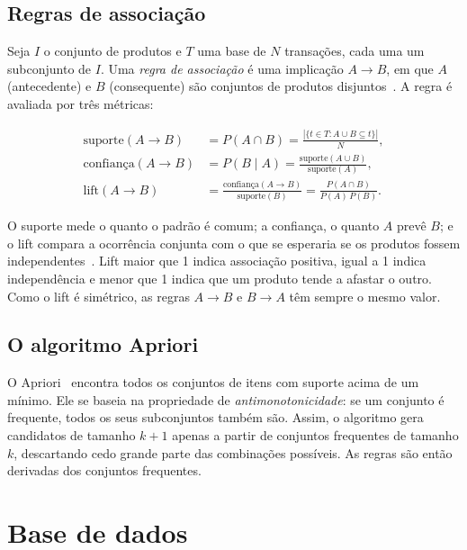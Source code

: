 \documentclass[11pt,a4paper]{article}
\begin{document}
\subsection{Regras de associação}

Seja $I$ o conjunto de produtos e $T$ uma base de $N$ transações, cada uma um subconjunto de $I$. Uma \emph{regra de associação} é uma implicação $A \rightarrow B$, em que $A$ (antecedente) e $B$ (consequente) são conjuntos de produtos disjuntos~\cite{agrawal1993}. A regra é avaliada por três métricas:

\begin{align}
\text{suporte}(A \rightarrow B)   &= P(A \cap B) = \frac{|\{t \in T : A \cup B \subseteq t\}|}{N}, \\[4pt]
\text{confiança}(A \rightarrow B) &= P(B \mid A) = \frac{\text{suporte}(A \cup B)}{\text{suporte}(A)}, \\[4pt]
\text{lift}(A \rightarrow B)      &= \frac{\text{confiança}(A \rightarrow B)}{\text{suporte}(B)} = \frac{P(A \cap B)}{P(A)\,P(B)}.
\end{align}

O suporte mede o quanto o padrão é comum; a confiança, o quanto $A$ prevê $B$; e o lift compara a ocorrência conjunta com o que se esperaria se os produtos fossem independentes~\cite{brin1997}. Lift maior que 1 indica associação positiva, igual a 1 indica independência e menor que 1 indica que um produto tende a afastar o outro. Como o lift é simétrico, as regras $A \rightarrow B$ e $B \rightarrow A$ têm sempre o mesmo valor.

\subsection{O algoritmo Apriori}

O Apriori~\cite{agrawal1994} encontra todos os conjuntos de itens com suporte acima de um mínimo. Ele se baseia na propriedade de \emph{antimonotonicidade}: se um conjunto é frequente, todos os seus subconjuntos também são. Assim, o algoritmo gera candidatos de tamanho $k+1$ apenas a partir de conjuntos frequentes de tamanho $k$, descartando cedo grande parte das combinações possíveis. As regras são então derivadas dos conjuntos frequentes.

\section{Base de dados}
\end{document}
